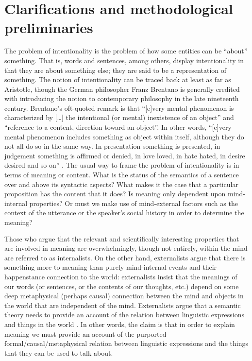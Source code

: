 \chapter{Clarifications and methodological preliminaries}

The problem of intentionality is the problem of how some entities can be “about” something. That is, words and sentences, among others, display intentionality in that they are about something else; they are said to be a representation of something. The notion of intentionality can be traced back at least as far as Aristotle, though the German philosopher Franz Brentano is generally credited with introducing the notion to contemporary philosophy in the late nineteenth century. Brentano’s oft-quoted remark is that “[e]very mental phenomenon is characterized by […] the intentional (or mental) inexistence of an object” and “reference to a content, direction toward an object”. In other words, “[e]very mental phenomenon includes something as object within itself, although they do not all do so in the same way. In presentation something is presented, in judgement something is affirmed or denied, in love loved, in hate hated, in desire desired and so on” \citep[68]{Brentano1874}. The usual way to frame the problem of intentionality is in terms of meaning or content. What is the status of the semantics of a sentence over and above its syntactic aspects? What makes it the case that a particular proposition has the content that it does? Is meaning only dependent upon mind-internal properties? Or must we make use of mind-external factors such as the context of the utterance or the speaker’s social history in order to determine the meaning?

Those who argue that the relevant and scientifically interesting properties that are involved in meaning are overwhelmingly, though not entirely, within the mind are referred to as internalists. On the other hand, externalists argue that there is something more to meaning than purely mind-internal events and their happenstance connection to the world: externalists insist that the meanings of our words (or sentences, or the contents of our thoughts, etc.) depend on some deep metaphysical (perhaps causal) connection between the mind and objects in the world that are independent of the mind. Externalists argue that a semantic theory needs to provide an account of the relation between linguistic expressions and things in the world \citep{Cann1993}. In other words, the claim is that in order to explain meaning we must provide an account of the purported formal/causal/metaphysical relation between linguistic expressions and the things that they can be used to talk about. 

